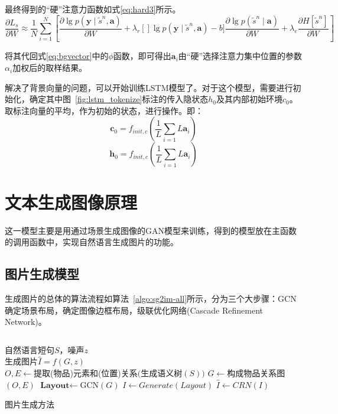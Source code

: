 最终得到的“硬”注意力函数如式\eqref{eq:hard3}所示。
\begin{equation}
    \frac{\partial L_s}{\partial W} \approx \frac{1}{N} \sum_{i=1}^N\left[\frac{\partial \lg p(\textbf{y}\mid \tilde{s}^n,\textbf{a})}{\partial W} + \lambda_r[]\lg p(\textbf{y}\mid \tilde{s}^n,\textbf{a})-b] \frac{\partial \lg p(\tilde{s}^n \mid \textbf{a})}{\partial W} +\lambda_e\frac{\partial H[\tilde{s}^n]}{\partial W}\right]
    \label{eq:hard3}
\end{equation}

将其代回式\eqref{eq:bgvector}中的$\phi$函数，即可得出${\textbf{a}_i}$由“硬”选择注意力集中位置的参数${\alpha_i}$加权后的取样结果。

解决了背景向量的问题，可以开始训练LSTM模型了。对于这个模型，需要进行初始化，确定其中图~\ref{fig:lstm_tokenize}标注的传入隐状态$h_0$及其内部初始环境$c_0$。取标注向量的平均，作为初始的状态，进行操作。即：
$$\textbf{c}_0 = f_{init,c}\left(\frac{1}{L}\sum_{i=1}{L}\textbf{a}_i\right)$$
$$\textbf{h}_0 = f_{init,c}\left(\frac{1}{L}\sum_{i=1}{L}\textbf{a}_i\right)$$

\section{文本生成图像原理}
这一模型主要是用通过场景生成图像的GAN模型来训练，得到的模型放在主函数的调用函数中，实现自然语言生成图片的功能。

\subsection{图片生成模型}
生成图片的总体的算法流程如算法~\ref{algo:sg2im-all}所示，分为三个大步骤：GCN确定场景布局，确定图像边框布局，级联优化网络(Cascade Refinement Network)。

$$$$
\begin{algorithm}[H]
    \SetAlgoLined
    \vspace{2em}
    \algorithmicrequire 自然语言短句$S$，噪声$z$\\
    \algorithmicensure 生成图片$\hat{I} = f(G,z)$\\
    $O,E \gets $提取(物品)元素和(位置)关系$($生成语义树$(S))$\;
    $G \gets $构成物品关系图$(O,E)$\;
    $\textbf{Layout} \gets $GCN$(G)$\;
    $I \gets Generate(Layout)$ \;
    $\hat{I} \gets CRN(I)$\;
    \caption{图片生成方法}
    \label{algo:sg2im-all}
\end{algorithm}

